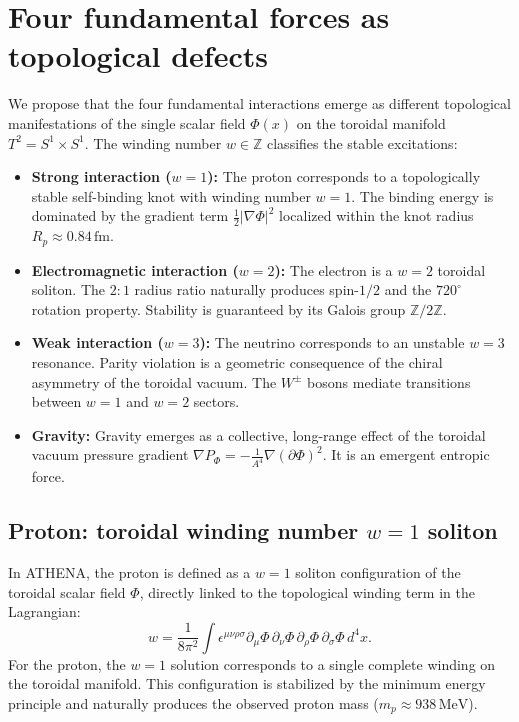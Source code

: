 \documentclass[11pt,a4paper]{article}
\begin{document}
\section{Four fundamental forces as topological defects}
\label{sec:forces}
We propose that the four fundamental interactions emerge as different topological manifestations of the single scalar field \(\Phi(x)\) on the toroidal manifold \(T^2 = S^1 \times S^1\). The winding number \(w \in \mathbb{Z}\) classifies the stable excitations:

\begin{itemize}
\item \textbf{Strong interaction (\(w=1\)):} The proton corresponds to a topologically stable self-binding knot with winding number \(w=1\). The binding energy is dominated by the gradient term \(\frac{1}{2}|\nabla \Phi|^2\) localized within the knot radius \(R_p \approx 0.84\,\mathrm{fm}\).
\item \textbf{Electromagnetic interaction (\(w=2\)):} The electron is a \(w=2\) toroidal soliton. The \(2:1\) radius ratio naturally produces spin-\(1/2\) and the \(720^\circ\) rotation property. Stability is guaranteed by its Galois group \(\mathbb{Z}/2\mathbb{Z}\).
\item \textbf{Weak interaction (\(w=3\)):} The neutrino corresponds to an unstable \(w=3\) resonance. Parity violation is a geometric consequence of the chiral asymmetry of the toroidal vacuum. The \(W^\pm\) bosons mediate transitions between \(w=1\) and \(w=2\) sectors.
\item \textbf{Gravity:} Gravity emerges as a collective, long-range effect of the toroidal vacuum pressure gradient \(\nabla P_\Phi = -\frac{1}{A^4} \nabla (\partial \Phi)^2\). It is an emergent entropic force.
\end{itemize}

\subsection{Proton: toroidal winding number \(w=1\) soliton}
\label{subsec:proton}
In ATHENA, the proton is defined as a \(w=1\) soliton configuration of the toroidal scalar field \(\Phi\), directly linked to the topological winding term in the Lagrangian:
\[
w = \frac{1}{8\pi^2} \int \epsilon^{\mu\nu\rho\sigma} \partial_\mu \Phi \, \partial_\nu \Phi \, \partial_\rho \Phi \, \partial_\sigma \Phi \, d^4x.
\]
For the proton, the \(w=1\) solution corresponds to a single complete winding on the toroidal manifold. This configuration is stabilized by the minimum energy principle and naturally produces the observed proton mass (\(m_p \approx 938\,\mathrm{MeV}\)).
\end{document}
